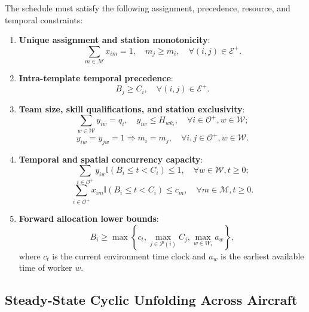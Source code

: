 \documentclass[journal,10pt]{IEEEtran}
\begin{document}
The schedule must satisfy the following assignment, precedence, resource, and temporal constraints:
\begin{enumerate}
\item \textbf{Unique assignment and station monotonicity}:
\begin{equation}
\sum_{m\in\mathcal{M}} x_{im} = 1, \quad m_j \ge m_i, \quad \forall (i,j)\in\mathcal{E}^+.
\end{equation}
\item \textbf{Intra-template temporal precedence}:
\begin{equation}
B_j \ge C_i, \quad \forall (i,j)\in\mathcal{E}^+.
\end{equation}
\item \textbf{Team size, skill qualifications, and station exclusivity}:
\begin{equation}
\sum_{w\in\mathcal{W}} y_{iw} = q_i, \quad y_{iw} \le H_{w k_i}, \quad \forall i\in\mathcal{O}^+, w\in\mathcal{W};
\end{equation}
\begin{equation}
y_{iw} = y_{jw} = 1 \Longrightarrow m_i = m_j, \quad \forall i,j\in\mathcal{O}^+, w\in\mathcal{W}.
\end{equation}
\item \textbf{Temporal and spatial concurrency capacity}:
\begin{equation}
\sum_{i\in\mathcal{O}^+} y_{iw} \mathbb{I}(B_i \le t < C_i) \le 1, \quad \forall w\in\mathcal{W}, t\ge0;
\end{equation}
\begin{equation}
\sum_{i\in\mathcal{O}^+} x_{im} \mathbb{I}(B_i \le t < C_i) \le c_m, \quad \forall m\in\mathcal{M}, t\ge0.
\end{equation}
\item \textbf{Forward allocation lower bounds}:
\begin{equation}
B_i \ge \max\left\{c_t, \max_{j\in\mathcal{P}(i)} C_j, \max_{w\in W_i} a_w\right\},
\end{equation}
where $c_t$ is the current environment time clock and $a_w$ is the earliest available time of worker $w$.
\end{enumerate}

\subsection{Steady-State Cyclic Unfolding Across Aircraft}
\end{document}
